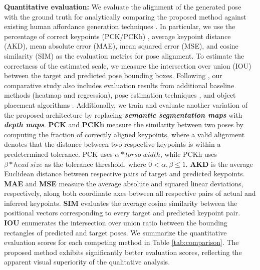 \noindent
\textbf{Quantitative evaluation:}
We evaluate the alignment of the generated pose with the ground truth for analytically comparing the proposed method against existing human affordance generation techniques \cite{wang2017binge, yao2023scene, zhang2022inpaint}. In particular, we use the percentage of correct keypoints (PCK/PCKh) \cite{yang2012articulated}, average keypoint distance (AKD), mean absolute error (MAE), mean squared error (MSE), and cosine similarity (SIM) as the evaluation metrics for pose alignment. To estimate the correctness of the estimated scale, we measure the intersection over union (IOU) between the target and predicted pose bounding boxes. Following \cite{yao2023scene}, our comparative study also includes evaluation results from additional baseline methods (heatmap and regression), pose estimation techniques \cite{artacho2020unipose, li2021pose}, and object placement algorithms \cite{zhang2020learning, zhou2022learning}. Additionally, we train and evaluate another variation of the proposed architecture by replacing \emph{\textbf{semantic segmentation maps}} with \emph{\textbf{depth maps}}. \textbf{PCK} and \textbf{PCKh} measure the similarity between two poses by computing the fraction of correctly aligned keypoints, where a valid alignment denotes that the distance between two respective keypoints is within a predetermined tolerance. PCK uses $\alpha * torso~width$, while PCKh uses $\beta * head~size$ as the tolerance threshold, where $0 < \alpha, \beta \leqslant 1$. \textbf{AKD} is the average Euclidean distance between respective pairs of target and predicted keypoints. \textbf{MAE} and \textbf{MSE} measure the average absolute and squared linear deviations, respectively, along both coordinate axes between all respective pairs of actual and inferred keypoints. \textbf{SIM} evaluates the average cosine similarity between the positional vectors corresponding to every target and predicted keypoint pair. \textbf{IOU} enumerates the intersection over union ratio between the bounding rectangles of predicted and target poses. We summarize the quantitative evaluation scores for each competing method in Table \ref{tab:comparison}. The proposed method exhibits significantly better evaluation scores, reflecting the apparent visual superiority of the qualitative analysis.

